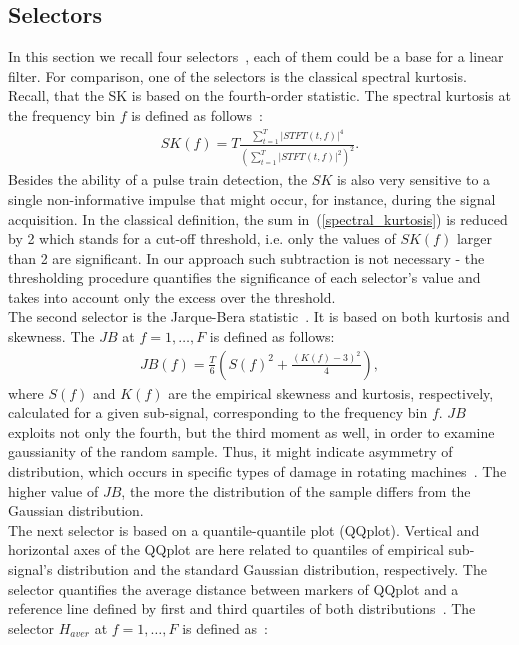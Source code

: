 \documentclass[11pt]{article} %
\begin{document}
\subsection{Selectors}\label{selectors}
In this section we recall four selectors~\cite{SelectorsMSSP,bib04}, each of them could be a base for a linear filter. For comparison, one of the selectors is the classical spectral kurtosis. Recall, that the SK is based on the fourth-order statistic. The spectral kurtosis at the frequency bin $f$ is defined as follows~\cite{Antoni2SK}:
\begin{eqnarray}\label{spectral_kurtosis}
SK(f)=T\frac{\sum_{t=1}^{T}|STFT(t,f)|^4}{(\sum_{t=1}^{T}|STFT(t,f)|^2)^2}.
\end{eqnarray}
Besides the ability of a pulse train detection, the $SK$ is also very sensitive to a single non-informative impulse that might occur, for instance, during the signal acquisition. In the classical definition, the sum in~(\ref{spectral_kurtosis}) is reduced by 2 which stands for a cut-off threshold, i.e. only the values of $SK(f)$ larger than 2 are significant. In our approach such subtraction is not necessary - the thresholding procedure quantifies the significance of each selector's value and takes into account only the excess over the threshold.\\
The second selector is the Jarque-Bera statistic~\cite{bib09,Burnecki}. It is based on both kurtosis and skewness. The $JB$ at $f=1,\ldots,F$ is defined as follows:
\begin{eqnarray}
JB(f)=\frac{T}{6}\left(S(f)^2+\frac{\left(K(f)-3\right)^2}{4}\right),
\end{eqnarray}
where $S(f)$ and $K(f)$ are the empirical skewness and kurtosis, respectively, calculated for a given sub-signal, corresponding to the frequency bin $f$. $JB$ exploits not only the fourth, but the third moment as well, in order to examine gaussianity of the random sample. Thus, it might indicate asymmetry of distribution, which occurs in specific types of damage in rotating machines~\cite{Paajarvi}. The higher value of $JB$, the more the distribution of the sample differs from the Gaussian distribution.\\
The next selector is based on a quantile-quantile plot (QQplot). Vertical and horizontal axes of the QQplot are here related to quantiles of empirical sub-signal's distribution and the standard Gaussian distribution, respectively. The selector quantifies the average distance between markers of QQplot and a reference line defined by first and third quartiles of both distributions~\cite{bib04}. The selector $H_{aver}$ at $f=1,\ldots,F$ is defined as~\cite{SelectorsMSSP}:
\end{document}
